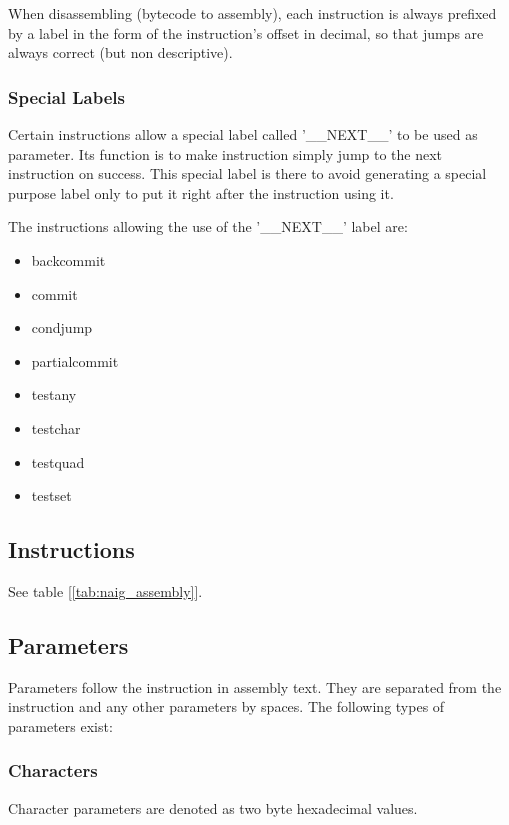 When disassembling (bytecode to assembly), each instruction is always
prefixed by a label in the form of the instruction's offset in decimal,
so that jumps are always correct (but non descriptive).

\subsubsection{Special Labels}

Certain instructions allow a special label called '\_\_NEXT\_\_' to be
used as parameter. Its function is to make instruction simply jump to
the next instruction on success.
This special label is there to avoid generating a special purpose label
only to put it right after the instruction using it.

The instructions allowing the use of the '\_\_NEXT\_\_' label are:

\begin{itemize}
\item backcommit
\item commit
\item condjump
\item partialcommit
\item testany
\item testchar
\item testquad
\item testset
\end{itemize}

\subsection{Instructions}



See table [\ref{tab:naig_assembly}].

\subsection{Parameters}

Parameters follow the instruction in assembly text. They are separated
from the instruction and any other parameters by spaces. The following
types of parameters exist:

\subsubsection{Characters}

Character parameters are denoted as two byte hexadecimal values.

